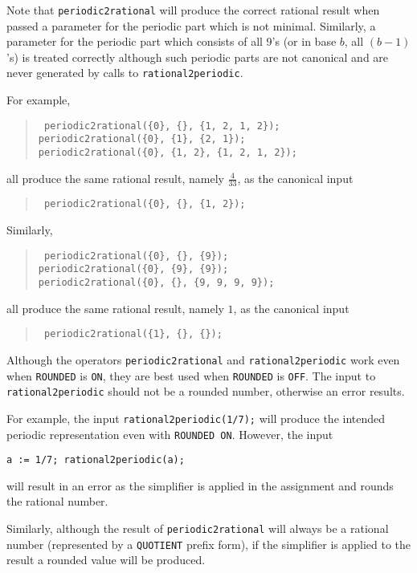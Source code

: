 Note that \texttt{periodic2rational} will produce the correct rational result
when passed a parameter for the periodic part which is not minimal.
Similarly, a parameter for the periodic part which consists of all 9's
(or in base $b$, all $(b-1)$'s) is treated correctly although such periodic
parts are not canonical and are never generated by calls to
\texttt{rational2periodic}.

For example,
\begin{quote}\tt
  periodic2rational(\{0\}, \{\}, \{1, 2, 1, 2\}); \\
  periodic2rational(\{0\}, \{1\}, \{2, 1\}); \\
  periodic2rational(\{0\}, \{1, 2\}, \{1, 2, 1, 2\});
\end{quote}
all produce the same rational result, namely $\frac{4}{33}$, as the canonical input
\begin{quote}\tt
  periodic2rational(\{0\}, \{\}, \{1, 2\});
\end{quote}
Similarly,
\begin{quote}\tt
  periodic2rational(\{0\}, \{\}, \{9\}); \\
  periodic2rational(\{0\}, \{9\}, \{9\}); \\
  periodic2rational(\{0\}, \{\}, \{9, 9, 9, 9\});
\end{quote}
all produce the same rational result, namely $1$, as the  canonical input
\begin{quote}\tt
  periodic2rational(\{1\}, \{\}, \{\});
\end{quote}

Although the operators \texttt{periodic2rational} and
\texttt{rational2periodic} work even when \texttt{ROUNDED} is \texttt{ON},
they are best used when \texttt{ROUNDED} is \texttt{OFF}. The input
to \texttt{rational2periodic} should not be a rounded number, otherwise
an error results.

For example, the input \texttt{rational2periodic(1/7);} will produce the
intended periodic representation even with \texttt{ROUNDED ON}. However,
 the input

\texttt{a := 1/7; rational2periodic(a);}

will result in an error as the simplifier is applied in the assignment and
rounds the rational number.

Similarly, although the result of \texttt{periodic2rational} will always be
a rational number (represented by a \texttt{QUOTIENT} prefix form), if the
simplifier is applied to the result a rounded value will be produced.

